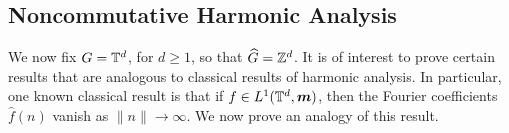 \subsection{Noncommutative Harmonic Analysis}

We now fix $G = \mathbb{T}^d$, for $d \geq 1$, so that $\widehat{G} = \mathbb{Z}^d$. It is of interest
to prove certain results that are analogous to classical results of harmonic
analysis. In particular, one known classical result is that if $f \in L^1(\mathbb{T}^d,\boldsymbol{m})$,
then the Fourier coefficients $\hat{f}(n)$ vanish as $\|n\|\rightarrow \infty$. We now
prove an analogy of this result. 

